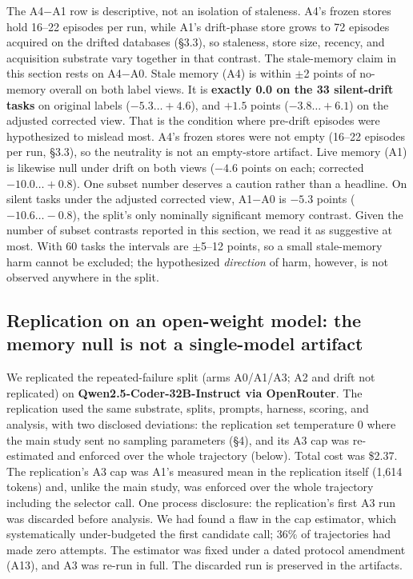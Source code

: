 \documentclass[sigconf, nonacm]{acmart}
\begin{document}
The A4$-$A1 row is descriptive, not an isolation of staleness. A4's frozen stores hold 16--22 episodes per run, while A1's drift-phase store grows to 72 episodes acquired on the drifted databases (\S3.3), so staleness, store size, recency, and acquisition substrate vary together in that contrast. The stale-memory claim in this section rests on A4$-$A0. Stale memory (A4) is within $\pm$2 points of no-memory overall on both label views. It is \textbf{exactly 0.0 on the 33 silent-drift tasks} on original labels ($-5.3\ldots+4.6$), and $+1.5$ points ($-3.8\ldots+6.1$) on the adjusted corrected view. That is the condition where pre-drift episodes were hypothesized to mislead most. A4's frozen stores were not empty (16--22 episodes per run, \S3.3), so the neutrality is not an empty-store artifact. Live memory (A1) is likewise null under drift on both views ($-4.6$ points on each; corrected $-10.0\ldots+0.8$). One subset number deserves a caution rather than a headline. On silent tasks under the adjusted corrected view, A1$-$A0 is $-5.3$ points ($-10.6\ldots-0.8$), the split's only nominally significant memory contrast. Given the number of subset contrasts reported in this section, we read it as suggestive at most. With 60 tasks the intervals are $\pm$5--12 points, so a small stale-memory harm cannot be excluded; the hypothesized \emph{direction} of harm, however, is not observed anywhere in the split.

\subsection{Replication on an open-weight model: the memory null is not a single-model artifact}

We replicated the repeated-failure split (arms A0/A1/A3; A2 and drift not replicated) on \textbf{Qwen2.5-Coder-32B-Instruct via OpenRouter}. The replication used the same substrate, splits, prompts, harness, scoring, and analysis, with two disclosed deviations: the replication set temperature 0 where the main study sent no sampling parameters (\S4), and its A3 cap was re-estimated and enforced over the whole trajectory (below). Total cost was \$2.37. The replication's A3 cap was A1's measured mean in the replication itself (1,614 tokens) and, unlike the main study, was enforced over the whole trajectory including the selector call. One process disclosure: the replication's first A3 run was discarded before analysis. We had found a flaw in the cap estimator, which systematically under-budgeted the first candidate call; 36\% of trajectories had made zero attempts. The estimator was fixed under a dated protocol amendment (A13), and A3 was re-run in full. The discarded run is preserved in the artifacts.
\end{document}
